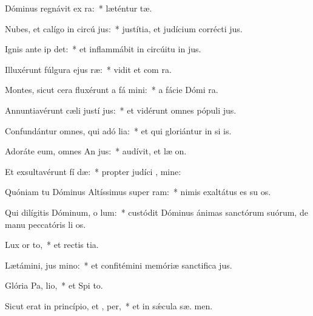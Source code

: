 \item Dóminus regnávit ex ra:~* læténtur  tæ.
\item Nubes, et calígo in circú jus:~* justítia, et judícium corrécti  jus.
\item Ignis ante ip det:~* et inflammábit in circúitu in jus.
\item Illuxérunt fúlgura ejus  ræ:~* vidit et com  ra.
\item Montes, sicut cera fluxérunt a fá mini:~* a fácie Dómi  ra.
\item Annuntiavérunt cæli justí jus:~* et vidérunt omnes pópuli  jus.
\item Confundántur omnes, qui adó lia:~* et qui gloriántur in si is.
\item Adoráte eum, omnes An jus:~* audívit, et læ  on.
\item Et exsultavérunt fí dæ:~* propter judíci , mine:
\item Quóniam tu Dóminus Altíssimus super  ram:~* nimis exaltátus es su  os.
\item Qui dilígitis Dóminum, o lum:~* custódit Dóminus ánimas sanctórum suórum, de manu peccatóris li os.
\item Lux or  to,~* et rectis  tia.
\item Lætámini, jus  mino:~* et confitémini memóriæ sanctifica jus.
\item Glória Pa,  lio,~* et Spi to.
\item Sicut erat in princípio, et ,  per,~* et in sǽcula sæ. men.
